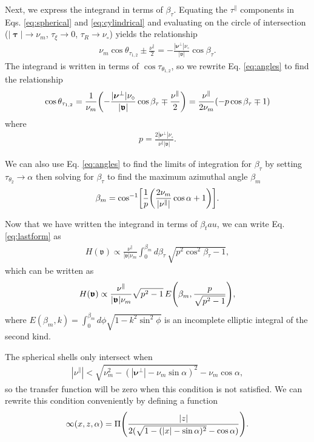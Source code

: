 \documentclass[]{osa-article}
\let\originalleft\left
\let\originalright\right
\renewcommand{\left}{\mathopen{}\mathclose\bgroup\originalleft}
\renewcommand{\right}{\aftergroup\egroup\originalright}
\newcommand{\mypar}{\parallel}
\providecommand{\bs}[1]{\boldsymbol{#1}}
\providecommand{\bv}{\boldsymbol{\mathfrak{v}}}
\providecommand{\bvperp}{\bs{\nu}^{\bot}}
\providecommand{\bvpar}{\nu^{\parallel}}
\providecommand{\bt}{\bs{\uptau}}
\providecommand{\btpar}{\tau^{\mypar}}
\begin{document}
Next, we express the integrand in terms of $\beta_\tau$. Equating the $\btpar$ components in Eqs. \eqref{eq:spherical} and \eqref{eq:cylindrical} and evaluating on the circle of intersection ($|\bt|\rightarrow \nu_m$, $\tau_\xi\rightarrow 0$, $\tau_R\rightarrow \nu_\circ$) yields the relationship
\begin{align}
  \nu_m\cos\theta_{\tau_{1,2}} \pm \frac{\bvpar}{2} = -\frac{|\bvperp|\nu_\circ}{|\bv|}\cos\beta_\tau\label{eq:angles}.
\end{align}
The integrand is written in terms of $\cos\tau_{\theta_{1,2}}$, so we rewrite Eq. \eqref{eq:angles} to find the relationship
\begin{align}
  \cos\theta_{\tau_{1,2}} = \frac{1}{\nu_m}\left(-\frac{|\bvperp|\nu_\circ}{|\bv|}\cos\beta_\tau\mp \frac{\bvpar}{2}\right) = \frac{\bvpar}{2\nu_m}\left(-p\cos\beta_\tau \mp 1\right)
\end{align}
where
\begin{align}
  p = \frac{2|\bvperp|\nu_\circ}{\bvpar|\bv|}.
\end{align}

We can also use Eq. \eqref{eq:angles} to find the limits of integration for $\beta_\tau$ by setting $\tau_{\theta_2} \rightarrow \alpha$ then solving for $\beta_\tau$ to find the maximum azimuthal angle $\beta_m$
\begin{align}
  \beta_m = \cos^{-1}\left[\frac{1}{p}\left(\frac{2\nu_m}{|\bvpar|}\cos\alpha + 1\right)\right].
\end{align}

Now that we have written the integrand in terms of $\beta_tau$, we can write Eq. \eqref{eq:lastform} as
\begin{align}
  H(\bv) \propto \frac{\bvpar}{|\bv|\nu_m}\int_{0}^{\beta_m}d\beta_\tau\, \sqrt{p^2\cos^2\beta_\tau - 1}, 
\end{align}
which can be written as 
\begin{align}
  H(\bv) \propto \frac{\bvpar}{|\bv|\nu_m}\sqrt{p^2 - 1}\,E\left(\beta_m, \frac{p}{\sqrt{p^2 - 1}}\right), \label{eq:intresult}
\end{align}
where $E(\beta_m, k)  = \int_0^{\beta_m} d\phi\sqrt{1 - k^2\sin^2\phi}$ is an incomplete elliptic integral of the second kind.

The spherical shells only intersect when 
\begin{align}
|\bvpar| < \sqrt{\nu_m^2 - (|\bvperp| - \nu_m\sin\alpha)^2} - \nu_m\cos\alpha, 
\end{align}
so the transfer function will be zero when this condition is not satisfied.
We can rewrite this condition conveniently by defining a function
\begin{align}
  \infty(x, z, \alpha) = \Pi\left(\frac{|z|}{2(\sqrt{1 - (|x| - \sin\alpha)^2} - \cos\alpha)}\right).
\end{align}
\end{document}
